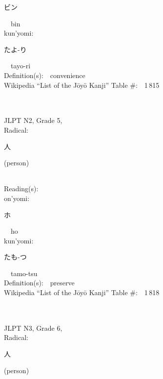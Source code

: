 \begin{multicols}{2}
{\hspace*{2em}}{\begin{CJK}{UTF8}{min} ビン \end{CJK}}\ \ bin\ \ \\
{\hspace*{1em}}kun'yomi:\ \ \\
{\hspace*{2em}}{\begin{CJK}{UTF8}{min} たよ-り \end{CJK}}\ \ tayo-ri\ \ \\
Definition(s):\ \ convenience \\
Wikipedia ``List of the J\=oy\=o Kanji'' Table \#:\ \ 1\,815 \\
\ \ \\
{\fontsize{34pt}{40pt}  }\ \ \\  %
{JLPT N2, Grade 5, \\Radical:\ \ {\begin{CJK}{UTF8}{min} 人 \end{CJK}} (person) } \\
Reading(s):\ \ \\
{\hspace*{1em}}on'yomi:\ \ \\
{\hspace*{2em}}{\begin{CJK}{UTF8}{min} ホ \end{CJK}}\ \ ho\ \ \\
{\hspace*{1em}}kun'yomi:\ \ \\
{\hspace*{2em}}{\begin{CJK}{UTF8}{min} たも-つ \end{CJK}}\ \ tamo-tsu\ \ \\
Definition(s):\ \ preserve \\
Wikipedia ``List of the J\=oy\=o Kanji'' Table \#:\ \ 1\,818 \\
\ \ \\
{\fontsize{34pt}{40pt}  }\ \ \\  %
{JLPT N3, Grade 6, \\Radical:\ \ {\begin{CJK}{UTF8}{min} 人 \end{CJK}} (person) } \\

\end{multicols}
